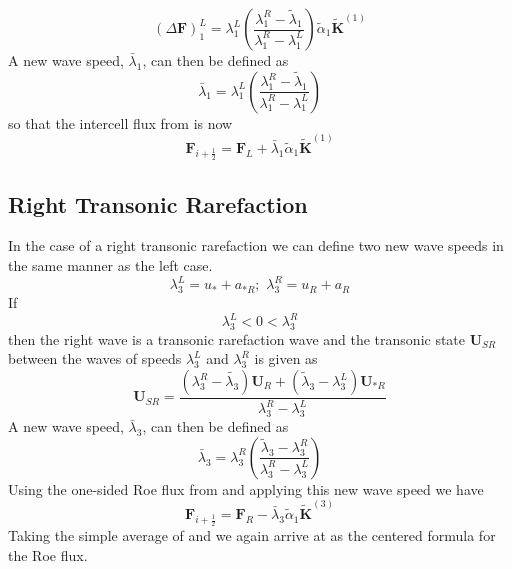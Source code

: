 \begin{equation}
	\left(\Delta \boldsymbol{F}\right)_1^L = \lambda_1^L \left(\frac{\lambda_1^R - \tilde{\lambda}_1}{\lambda_1^R - \lambda_1^L}\right) \tilde{\alpha}_1 \tilde{\boldsymbol{K}}^{(1)}
\end{equation}
A new wave speed, $\bar{\lambda}_1$, can then be defined as
\begin{equation}
	\bar{\lambda}_1 = \lambda_1^L \left(\frac{\lambda_1^R - \tilde{\lambda}_1}{\lambda_1^R - \lambda_1^L}\right)
\end{equation}
so that the intercell flux from  is now
\begin{equation}\label{eq:Fsum1Entropy}
	\boldsymbol{F}_{i+\frac{1}{2}} = \boldsymbol{F}_L + \bar{\lambda}_1 \tilde{\alpha}_1 \tilde{\boldsymbol{K}}^{(1)}
\end{equation}
\subsection{Right Transonic Rarefaction}
In the case of a right transonic rarefaction we can define two new wave speeds in the same manner as the left case.
\begin{equation}
	\lambda_3^L = u_* + a_{*R} ; \, \, \lambda_3^R = u_R + a_R
\end{equation}
If
\begin{equation}
	\lambda_3^L < 0 < \lambda_3^R
\end{equation}
then the right wave is a transonic rarefaction wave and the transonic state $\boldsymbol{U}_{SR}$ between the waves of speeds $\lambda_3^L$ and $\lambda_3^R$ is given as
\begin{equation}
	\boldsymbol{U}_{SR} = \frac{ \left( \lambda_3^R - \tilde{\lambda_3} \right) \boldsymbol{U}_R + \left( \tilde{\lambda}_3 - \lambda_3^L \right) \boldsymbol{U}_{*R}}{\lambda_3^R - \lambda_3^L}
\end{equation}
A new wave speed, $\bar{\lambda}_3$, can then be defined as
\begin{equation}
	\bar{\lambda}_3 = \lambda_3^R \left(\frac{\tilde{\lambda}_3 - \lambda_3^R}{\lambda_3^R - \lambda_3^L}\right)
\end{equation}
Using the one-sided Roe flux from  and applying this new wave speed we have
\begin{equation}\label{eq:Fsum2Entropy}
	\boldsymbol{F}_{i+\frac{1}{2}} = \boldsymbol{F}_R - \bar{\lambda}_3 \tilde{\alpha}_1 \tilde{\boldsymbol{K}}^{(3)}
\end{equation}
Taking the simple average of  and  we again arrive at  as the centered formula for the Roe flux.

